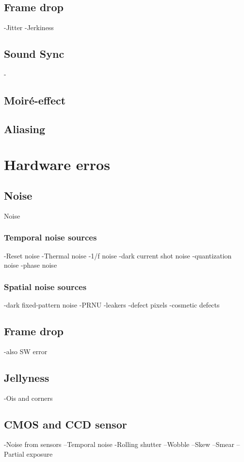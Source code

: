 \subsection{Frame drop}
-Jitter
-Jerkiness
\subsection{Sound Sync}
-
\subsection{Moir\'{e}-effect}

\subsection{Aliasing}

\section{Hardware  erros}

\subsection{Noise}

Noise 

\subsubsection{Temporal noise sources}
-Reset noise
-Thermal noise
-1/f noise
-dark current shot noise
-quantization noise
-phase noise
\subsubsection{Spatial noise sources}
-dark fixed-pattern noise
-PRNU
-leakers
-defect pixels
-cosmetic defects








\subsection{Frame drop}
-also SW error
\subsection{Jellyness}
-Ois and corners
\subsection{CMOS and CCD sensor}
-Noise from sensors
--Temporal noise
-Rolling shutter
--Wobble
--Skew
--Smear
--Partial exposure





